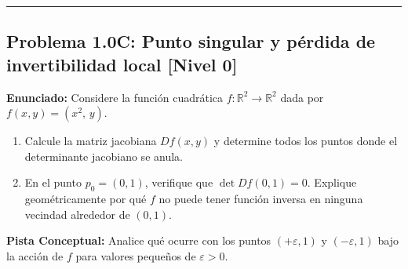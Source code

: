 \documentclass[11pt,a4paper]{article}
\begin{document}
\vspace{0.5cm}
\hrule
\vspace{0.5cm}
\subsection*{Problema 1.0C: Punto singular y pérdida de invertibilidad local \hfill \color{teal}\small[Nivel 0]}

\begin{tcolorbox}[colback=white,colframe=gray!40,arc=1mm,boxrule=0.5pt,left=3mm,right=3mm,top=2mm,bottom=2mm]
\textbf{Enunciado:} Considere la función cuadrática $f: \mathbb{R}^2 \to \mathbb{R}^2$ dada por $f(x,y) = (x^2, \, y)$.
\begin{enumerate}[label=\textbf{\alph*)}]
\item Calcule la matriz jacobiana $Df(x,y)$ y determine todos los puntos donde el determinante jacobiano se anula.
\item En el punto $p_0 = (0,1)$, verifique que $\det Df(0,1) = 0$. Explique geométricamente por qué $f$ no puede tener función inversa en ninguna vecindad alrededor de $(0,1)$.
\end{enumerate}
\end{tcolorbox}

\begin{tcolorbox}[colback=yellow!4,colframe=accentamber!70,arc=1mm,boxrule=0.5pt,left=3mm,right=3mm,top=1.5mm,bottom=1.5mm]
\textbf{Pista Conceptual:} Analice qué ocurre con los puntos $(+\varepsilon, 1)$ y $(-\varepsilon, 1)$ bajo la acción de $f$ para valores pequeños de $\varepsilon > 0$.
\end{tcolorbox}
\end{document}

